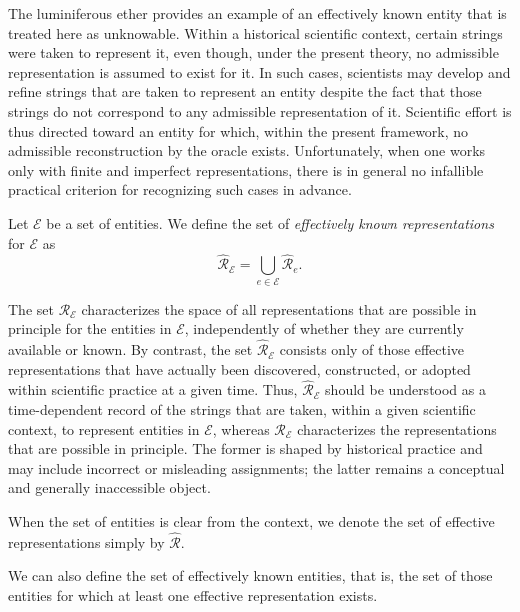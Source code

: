 The luminiferous ether provides an example of an effectively known entity that is treated here as unknowable. Within a historical scientific context, certain strings were taken to represent it, even though, under the present theory, no admissible representation is assumed to exist for it. In such cases, scientists may develop and refine strings that are taken to represent an entity despite the fact that those strings do not correspond to any admissible representation of it. Scientific effort is thus directed toward an entity for which, within the present framework, no admissible reconstruction by the oracle exists. Unfortunately, when one works only with finite and imperfect representations, there is in general no infallible practical criterion for recognizing such cases in advance.

\begin{definition}
Let $\mathcal{E}$ be a set of entities. We define the set of \emph{effectively known representations} for $\mathcal{E}$ as
\[
\hat{\mathcal{R}}_{\mathcal{E}} = \bigcup_{e \in \mathcal{E}} \hat{\mathcal{R}}_{e}.
\]
\end{definition}

\noindent
The set $\mathcal{R}_{\mathcal{E}}$ characterizes the space of all representations that are possible in principle for the entities in $\mathcal{E}$, independently of whether they are currently available or known. By contrast, the set $\hat{\mathcal{R}}_{\mathcal{E}}$ consists only of those effective representations that have actually been discovered, constructed, or adopted within scientific practice at a given time. Thus, $\hat{\mathcal{R}}_{\mathcal{E}}$ should be understood as a time-dependent record of the strings that are taken, within a given scientific context, to represent entities in $\mathcal{E}$, whereas $\mathcal{R}_{\mathcal{E}}$ characterizes the representations that are possible in principle. The former is shaped by historical practice and may include incorrect or misleading assignments; the latter remains a conceptual and generally inaccessible object.

\begin{notation}
When the set of entities is clear from the context, we denote the set of effective representations simply by $\hat{\mathcal{R}}$.
\end{notation}

We can also define the set of effectively known entities, that is, the set of those entities for which at least one effective representation exists.

